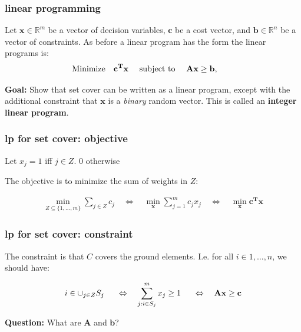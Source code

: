 \documentclass[compress]{beamer}
\newcommand{\bv}[1]{\mathbf{#1}}
\newcommand{\R}{\mathbb{R}}
\begin{document}
\begin{frame}
	\frametitle{linear programming}
	Let $\mathbf{x} \in \R^m$ be a vector
	of decision variables, $\mathbf{c}$ be a cost vector, and $\mathbf{b} \in \R^n$
	be a vector of constraints. As before a linear program has the form
	the linear programs is:
	\begin{align*}
		\textnormal{Minimize} \hspace{1em}
		\mathbf{c^T x} \hspace{1em}
		&\textnormal{ subject to } \hspace{1em}
		\mathbf{Ax \geq b}, \hspace{1em}
	\end{align*}
	
	\vspace{2em}	
	
	\textbf{Goal:} Show that set cover can be written as a linear program, except with the additional constraint that $\bv{x}$ is a \emph{binary} random vector. This is called an  \textbf{\alert{integer linear program}}.
\end{frame}

\begin{frame}
	\frametitle{lp for set cover: objective}
	
	Let $x_j = 1$ iff $j \in Z$. $0$ otherwise
	
	The objective is to minimize the sum of weights
	in $Z$:
	
	\begin{align*}
		\min_{Z\subseteq \{1,\ldots,m\}} \sum_{j \in Z} c_j
		\hspace{1em} \Leftrightarrow \hspace{1em}
		\min_{\mathbf{x}} \sum_{j=1}^m c_j x_j
		\hspace{1em} \Leftrightarrow \hspace{1em}
		\min_{\mathbf{x}} \mathbf{c^T x}
	\end{align*}
\end{frame}

\begin{frame}
	\frametitle{lp for set cover: constraint}
	
	The constraint is that $C$
	covers the ground elements. I.e. for all $i \in 1,\dots, n$, we should have:
	
	\begin{align*}
		i \in \cup_{j \in Z} S_j
		\hspace{1.5em} \Leftrightarrow \hspace{1em}
		\sum_{j:i \in S_j}^m x_j \geq 1 
		\hspace{1.5em} \Leftrightarrow \hspace{1em}
		\mathbf{A x \geq c}
	\end{align*}	
	
	\textbf{Question:} What are $\mathbf{A}$ and $\mathbf{b}$?
	
\end{frame}
\end{document}
